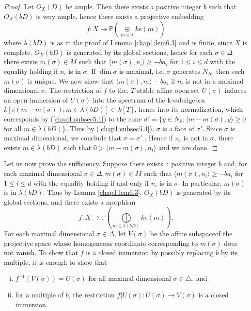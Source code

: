 \begin{proof}
Let $O_X(D)$ be ample. Then there exists a positive integer $b$ such
that $O_X(bD)$ is very ample, hence there exists a projective
embedding  
$$
f : X \to \mathbb{P} (\underset{m \in \lambda}{\oplus} ke (m) )
$$\pageoriginale
where $\lambda(b D)$ is as in the proof of Lemma \ref{chap1:lem6.3} and is
finite, since $X$ is complete. $O_{X}(bD)$ is generated by its global
sections, hence for each $\sigma \in \Delta$ there exists $m (\sigma)
\in M$ such that $\langle m (\sigma), n_{i}\rangle \geq - ba_{i}$ for
$1 \leq i \leq d $ with the equality holding if $n_{i}$ is in
$\sigma$. If $\dim \sigma$ is maximal, i.e. $\sigma$ generates
$N_{R}$, then such $m(\sigma)$ is unique. We now show that $\langle m
(\sigma), n_{i} \rangle - ba_{i}$ if $n_{i}$ is not in a maximal dimensional
$\sigma$. The restriction of $f$ to the. $T$-stable affine open set
$U(\sigma)$ induces an open immersion of $U(\sigma)$ into the spectrum
of the k-subalgebra $k[e (m-m(\sigma)) ; m \in \lambda (bD) ] \subset
k [T]$, hence into its normalization, which corresponds by
(\ref{chap1:subsec5.1}) to 
the cone $\sigma' = \{ y \in N_{\mathbb{R}} ; \langle m-m(\sigma), y
\rangle \geq 0$ for all $m \in \lambda (bD)\}$. Thus by
(\ref{chap1:subsec5.4}), $\sigma$ is a face of $\sigma'$. Since
$\sigma$ is maximal dimensional, we 
conclude that $\sigma = \sigma'$ . Hence if $n_{i}$ is not in
$\sigma$, there exists $m \in \lambda (bD)$ such that $0 > \langle m -
m (\sigma), n_{i}\rangle$ and we are done.  
\end{proof}

Let us now prove the sufficiency. Suppose there exists a positive
integer $b$ and, for each maximal dimensional $\sigma \in \Delta, m
(\sigma) \in M$ such that $\langle m(\sigma), n_{i}\rangle \geq
-ba_{i}$ for $1 \leq i \leq d$ with the equality holding if and only
if $n_{i}$ is in $\sigma$. In particular, $m (\sigma)$ is in
$\lambda(bD)$. Thus by Lemma \ref{chap1:lem6.3}, $O_{X}(bD)$ is generated by its
global sections, and there exists a morphism 
$$
f : X \longrightarrow \mathbb{P} (\bigoplus\limits_{m \in \lambda(bD)}ke
(m) ). 
$$  
\noindent
For each maximal dimensional $\sigma \in \Delta$, let $V(\sigma)$ be
the affine subspace\pageoriginale of the projective space whose homogeneous
coordinate corresponding to $m(\sigma)$ does not vanish. To show that
$f$ is a closed immersion by possibly replacing $b$ by its multiple,
it is enough to show that  
\begin{enumerate}[(i)]
\item $f^{-1}(V(\sigma)) = U(\sigma) $ for all maximal dimensional
  $\sigma \in \triangle$, and 

\item for a multiple of $b$, the restriction $f| U (\sigma) :
  U(\sigma) \to V(\sigma)$ is a closed immersion. 
\end{enumerate}

